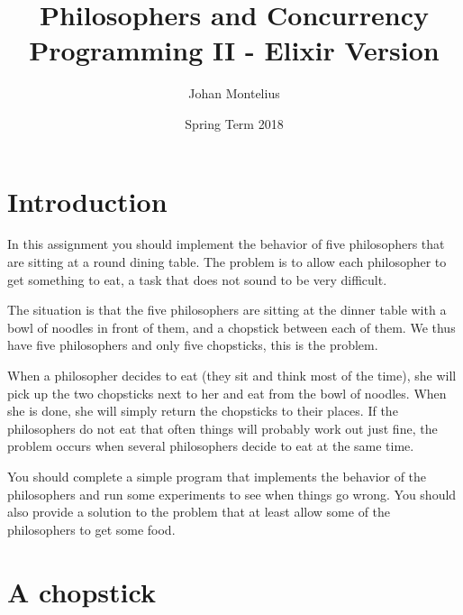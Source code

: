 \documentclass[a4paper,11pt]{article}
\begin{document}

\title{
    \textbf{Philosophers and Concurrency}\\
    \large{Programming II - Elixir Version}
}
\author{Johan Montelius}
\date{Spring Term 2018}
\maketitle
\thispagestyle{fancy}



\section*{Introduction}

In this assignment you should implement the behavior of five
philosophers that are sitting at a round dining table. The problem is to
allow each philosopher to get something to eat, a task that does not
sound to be very difficult. 

The situation is that the five philosophers are sitting at the dinner
table with a bowl of noodles in front of them, and a chopstick
between each of them. We thus have five philosophers and only five
chopsticks, this is the problem.

When a philosopher decides to eat (they sit and think most of the
time), she will pick up the two chopsticks next to her and eat from
the bowl of noodles. When she is done, she will simply return the
chopsticks to their places. If the philosophers do not eat that often
things will probably work out just fine, the problem occurs when
several philosophers decide to eat at the same time.

You should complete a simple program that implements the behavior
of the philosophers and run some experiments to see when things go
wrong. You should also provide a solution to the problem that at least
allow some of the philosophers to get some food.  



\section{A chopstick}
\end{document}

